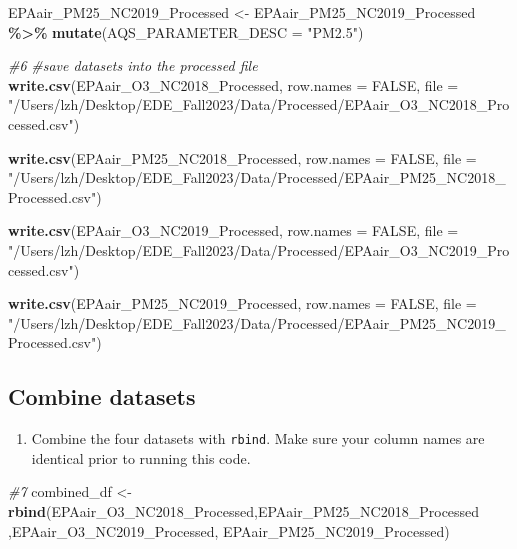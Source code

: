 \documentclass[
]{article}
\newenvironment{Shaded}{\begin{snugshade}}{\end{snugshade}}
\newcommand{\AttributeTok}[1]{\textcolor[rgb]{0.13,0.29,0.53}{#1}}
\newcommand{\CommentTok}[1]{\textcolor[rgb]{0.56,0.35,0.01}{\textit{#1}}}
\newcommand{\ConstantTok}[1]{\textcolor[rgb]{0.56,0.35,0.01}{#1}}
\newcommand{\FunctionTok}[1]{\textcolor[rgb]{0.13,0.29,0.53}{\textbf{#1}}}
\newcommand{\NormalTok}[1]{#1}
\newcommand{\OtherTok}[1]{\textcolor[rgb]{0.56,0.35,0.01}{#1}}
\newcommand{\SpecialCharTok}[1]{\textcolor[rgb]{0.81,0.36,0.00}{\textbf{#1}}}
\newcommand{\StringTok}[1]{\textcolor[rgb]{0.31,0.60,0.02}{#1}}
\providecommand{\tightlist}{%
  \setlength{\itemsep}{0pt}\setlength{\parskip}{0pt}}
\begin{document}
\begin{Shaded}
\begin{Highlighting}[]
\NormalTok{EPAair\_PM25\_NC2019\_Processed }\OtherTok{\textless{}{-}}\NormalTok{  EPAair\_PM25\_NC2019\_Processed }\SpecialCharTok{\%\textgreater{}\%} \FunctionTok{mutate}\NormalTok{(}\AttributeTok{AQS\_PARAMETER\_DESC =} \StringTok{"PM2.5"}\NormalTok{)}

\CommentTok{\#6}
\CommentTok{\#save datasets into the processed file}
\FunctionTok{write.csv}\NormalTok{(EPAair\_O3\_NC2018\_Processed, }\AttributeTok{row.names =} \ConstantTok{FALSE}\NormalTok{, }
          \AttributeTok{file =} \StringTok{"/Users/lzh/Desktop/EDE\_Fall2023/Data/Processed/EPAair\_O3\_NC2018\_Processed.csv"}\NormalTok{)}

\FunctionTok{write.csv}\NormalTok{(EPAair\_PM25\_NC2018\_Processed, }\AttributeTok{row.names =} \ConstantTok{FALSE}\NormalTok{, }
          \AttributeTok{file =} \StringTok{"/Users/lzh/Desktop/EDE\_Fall2023/Data/Processed/EPAair\_PM25\_NC2018\_Processed.csv"}\NormalTok{)}

\FunctionTok{write.csv}\NormalTok{(EPAair\_O3\_NC2019\_Processed, }\AttributeTok{row.names =} \ConstantTok{FALSE}\NormalTok{, }
          \AttributeTok{file =} \StringTok{"/Users/lzh/Desktop/EDE\_Fall2023/Data/Processed/EPAair\_O3\_NC2019\_Processed.csv"}\NormalTok{)}

\FunctionTok{write.csv}\NormalTok{(EPAair\_PM25\_NC2019\_Processed, }\AttributeTok{row.names =} \ConstantTok{FALSE}\NormalTok{, }
          \AttributeTok{file =} \StringTok{"/Users/lzh/Desktop/EDE\_Fall2023/Data/Processed/EPAair\_PM25\_NC2019\_Processed.csv"}\NormalTok{)}
\end{Highlighting}
\end{Shaded}

\hypertarget{combine-datasets}{%
\subsection{Combine datasets}\label{combine-datasets}}

\begin{enumerate}
\def\labelenumi{\arabic{enumi}.}
\setcounter{enumi}{6}
\tightlist
\item
  Combine the four datasets with \texttt{rbind}. Make sure your column
  names are identical prior to running this code.
\end{enumerate}

\begin{Shaded}
\begin{Highlighting}[]
\CommentTok{\#7}
\NormalTok{combined\_df }\OtherTok{\textless{}{-}} \FunctionTok{rbind}\NormalTok{(EPAair\_O3\_NC2018\_Processed,EPAair\_PM25\_NC2018\_Processed}
\NormalTok{                     ,EPAair\_O3\_NC2019\_Processed, EPAair\_PM25\_NC2019\_Processed)}
\end{Highlighting}
\end{Shaded}
\end{document}
